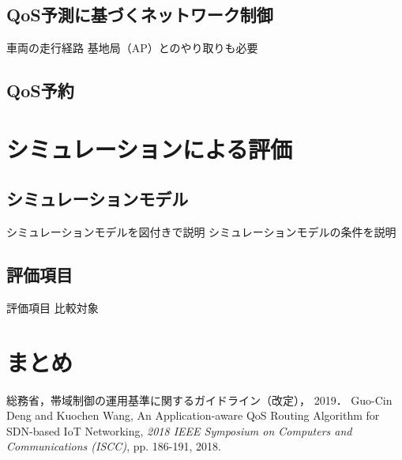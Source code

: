 \documentclass[a4paper,10pt,twocolumn,uplatex]{jsarticle}
\begin{document}
\subsection{QoS予測に基づくネットワーク制御}
\label{priority}
車両の走行経路
基地局（AP）とのやり取りも必要

\subsection{QoS予約}

\section{シミュレーションによる評価}
\subsection{シミュレーションモデル}
シミュレーションモデルを図付きで説明
シミュレーションモデルの条件を説明

\subsection{評価項目}
評価項目
比較対象

\section{まとめ}


\footnotesize{
  \begin{thebibliography}{99}
     総務省，帯域制御の運用基準に関するガイドライン（改定）， 2019．
     Guo-Cin Deng and Kuochen Wang, An Application-aware QoS Routing Algorithm for SDN-based IoT Networking, \textit{2018 IEEE Symposium on Computers and Communications (ISCC)}, pp. 186-191, 2018.
  \end{thebibliography}
}

% 
% 

\end{document}
